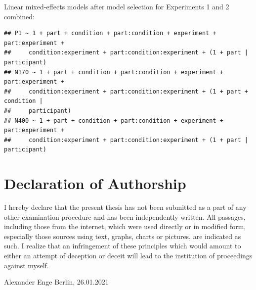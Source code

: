 \documentclass[
  english,
  doc,12pt,twoside,floatsintext]{apa7}
\begin{document}
\normalsize

\noindent Linear mixed-effects models after model selection for Experiments 1 and 2 combined:

\footnotesize

\begin{verbatim}
## P1 ~ 1 + part + condition + part:condition + experiment + part:experiment + 
##     condition:experiment + part:condition:experiment + (1 + part | participant)
## N170 ~ 1 + part + condition + part:condition + experiment + part:experiment + 
##     condition:experiment + part:condition:experiment + (1 + part + condition | 
##     participant)
## N400 ~ 1 + part + condition + part:condition + experiment + part:experiment + 
##     condition:experiment + part:condition:experiment + (1 + part | participant)
\end{verbatim}

\normalsize

\newpage
\setlength{\parindent}{0.5in}

\hypertarget{declaration-of-authorship}{%
\section*{Declaration of Authorship}\label{declaration-of-authorship}}

I hereby declare that the present thesis has not been submitted as a part of any other examination procedure and has been independently written. All passages, including those from the internet, which were used directly or in modified form, especially those sources using text, graphs, charts or pictures, are indicated as such. I realize that an infringement of these principles which would amount to either an attempt of deception or deceit will lead to the institution of proceedings against myself.

\vspace*{20mm}

\noindent
Alexander Enge\newline
Berlin, 26.01.2021

\clearpage

\mbox{}\thispagestyle{empty}\clearpage
\end{document}
